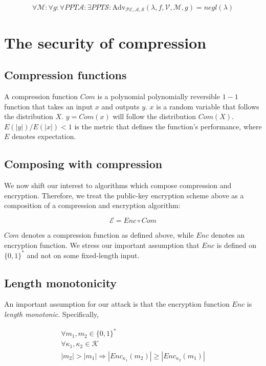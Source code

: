 \documentclass{article}
\begin{document}
\begin{equation*}
\forall \mathcal{M}:
\forall g:
\forall PPT \mathcal{A}:
\exists PPT \mathcal{S}:
\text{Adv}_{\mathcal{PE}, \mathcal{A}, \mathcal{S}}(\lambda, f, \mathcal{V}, \mathcal{M}, g) = negl(\lambda)
\end{equation*}

\section{The security of compression}

\subsection{Compression functions}

A compression function $Com$ is a polynomial polynomially reversible $1 - 1$
function that takes an input $x$ and outputs $y$. $x$ is a random variable that
follows the distribution $X$. $y = Com(x)$ will follow the
distribution $Com(X)$.  $E(|y|) / E(|x|) < 1$ is the metric that defines the
function's performance, where $E$ denotes expectation.

\subsection{Composing with compression}

We now shift our interest to algorithms which compose compression and
encryption.  Therefore, we treat the public-key encryption scheme above as a
composition of a compression and encryption algorithm:

\begin{equation*}
    \mathcal{E} = Enc \circ Com
\end{equation*}

$Com$ denotes a compression function as defined above, while $Enc$ denotes an
encryption function. We stress our important assumption that $Enc$ is defined
on $\{0, 1\}^*$ and not on some fixed-length input.

\subsection{Length monotonicity}

An important assumption for our attack is that the encryption function $Enc$ is
\textit{length monotonic}. Specifically,

\begin{equation*}
\begin{split}
\forall m_1, m_2 \in \{0, 1\}^*\\
\forall \kappa_1, \kappa_2 \in \mathcal{K}\\
|m_2| > |m_1|
\Rightarrow
|Enc_{\kappa_1}(m_2)| \geq |Enc_{\kappa_2}(m_1)|
\end{split}
\end{equation*}
\end{document}
